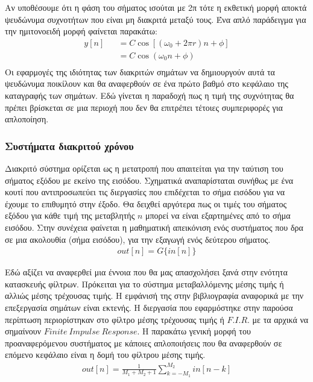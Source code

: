 \documentclass[breaklines=true, 12pt]{article}
\begin{document}
Αν υποθέσουμε ότι η φάση του σήματος ισούται με 2π τότε η εκθετική μορφή αποκτά
ψευδώνυμα συχνοτήτων που είναι μη διακριτά μεταξύ τους. Ένα απλό παράδειγμα
για την ημιτονοειδή μορφή φαίνεται παρακάτω:
\begin{equation}
\begin{align}
y[n]&&=C \cos[(\omega_{0} + 2\pi r)n + \phi] \\
&&=C \cos(\omega_{0}n + \phi) \\
\end{align}
\end{equation}
Οι εφαρμογές της ιδιότητας των διακριτών σημάτων να δημιουργούν αυτά τα ψευδώνυμα
ποικίλουν και θα αναφερθούν σε ένα πρώτο βαθμό στο κεφάλαιο της καταγραφής των
σημάτων. Εδώ γίνεται η παραδοχή πως η τιμή της συχνότητας θα πρέπει βρίσκεται
σε μια περιοχή που δεν θα επιτρέπει τέτοιες συμπεριφορές για απλοποίηση.
\subsubsection{Συστήματα διακριτού χρόνου}
\label{sec:org519b0f0}
Διακριτό σύστημα ορίζεται ως η μετατροπή που απαιτείται για την
ταύτιση του σήματος εξόδου με εκείνο της εισόδου. Σχηματικά
αναπαρίσταται συνήθως με ένα κουτί που αντιπροσωπεύει τις διεργασίες
που επιδέχεται το σήμα εισόδου για να έχουμε το επιθυμητό στην έξοδο.
Θα δειχθεί αργότερα πως οι τιμές του σήματος εξόδου για κάθε τιμή
της μεταβλητής \(n\) μπορεί να είναι εξαρτημένες από το σήμα εισόδου.
Στην συνέχεια φαίνεται η μαθηματική απεικόνιση ενός συστήματος που
δρα σε μια ακολουθία (σήμα εισόδου), για την εξαγωγή ενός δεύτερου
σήματος.
\begin{equation}
\begin{align}
out[n] = G\{in[n]\}
\end{align}
\end{equation}

Εδώ αξίζει να αναφερθεί μια έννοια που θα μας απασχολήσει ξανά στην
ενότητα κατασκευής φίλτρων. Πρόκειται για το σύστημα μεταβαλλόμενης μέσης
τιμής ή αλλιώς μέσης τρέχουσας τιμής. Η εμφάνισή της στην βιβλιογραφία
αναφορικά με την επεξεργασία σημάτων είναι εκτενής. Η διεργασία που
εφαρμόστηκε στην παρούσα περίπτωση  περιορίστηκαν στο φίλτρο μέσης
τρέχουσας τιμής ή \(F.I.R.\) με τα αρχικά να σημαίνουν \(Finite\ Impulse\ Response\).
Η παρακάτω γενική μορφή του προαναφερόμενου συστήματος με κάποιες
απλοποιήσεις που θα αναφερθούν σε επόμενο κεφάλαιο είναι η δομή του
φίλτρου μέσης τιμής.
\begin{equation}
\begin{align}
out[n] = \frac{1}{M_{1}+M_{2}+1}\sum_{k=-M_{1}}^{M_{2}} in[n-k]
\end{align}
\end{equation}
\end{document}
